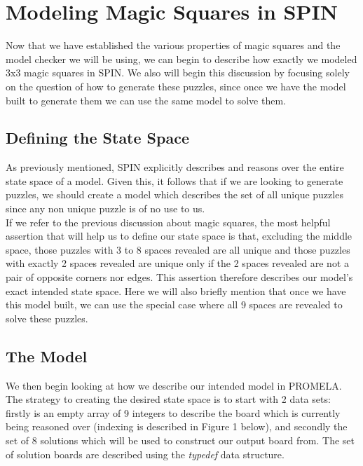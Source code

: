 \documentclass[a4paper]{article}
\begin{document}
\section{Modeling Magic Squares in SPIN}

Now that we have established the various properties of magic squares and the model checker we will be using, we can begin to describe how exactly we modeled 3x3 magic squares in SPIN. We also will begin this discussion by focusing solely on the question of how to generate these puzzles, since once we have the model built to generate them we can use the same model to solve them.

\subsection{Defining the State Space}
As previously mentioned, SPIN explicitly describes and reasons over the entire state space of a model. Given this, it follows that if we are looking to generate puzzles, we should create a model which describes the set of all unique puzzles since any non unique puzzle is of no use to us. \\

If we refer to the previous discussion about magic squares, the most helpful assertion that will help us to define our state space is that, excluding the middle space, those puzzles with 3 to 8 spaces revealed are all unique and those puzzles with exactly 2 spaces revealed are unique only if the 2 spaces revealed are not a pair of opposite corners nor edges. This assertion therefore describes our model's exact intended state space. Here we will also briefly mention that once we have this model built, we can use the special case where all 9 spaces are revealed to solve these puzzles. \\

\subsection{The Model}
We then begin looking at how we describe our intended model in PROMELA. The strategy to creating the desired state space is to start with 2 data sets: firstly is an empty array of 9 integers to describe the board which is currently being reasoned over (indexing is described in Figure 1 below), and secondly the set of 8 solutions which will be used to construct our output board from. The set of solution boards are described using the {\it typedef} data structure. \\
\end{document}
